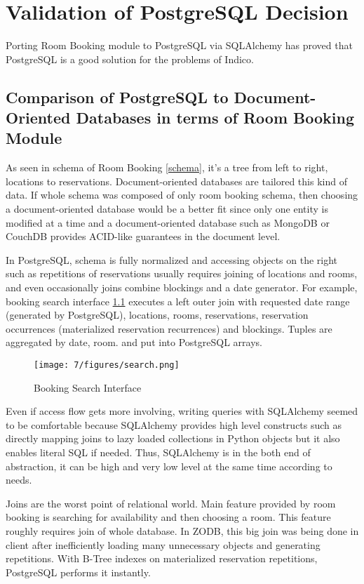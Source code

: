 \chapter{Validation of PostgreSQL Decision}

Porting Room Booking module to PostgreSQL via SQLAlchemy has proved that PostgreSQL is a good solution for the problems of Indico.

\section{Comparison of PostgreSQL to Document-Oriented Databases in terms of Room Booking Module}

As seen in schema of Room Booking \ref{schema}, it's a tree from left to right, locations to reservations. Document-oriented databases are tailored this kind of data. If whole schema was composed of only room booking schema, then choosing a document-oriented database would be a better fit since only one entity is modified at a time and a document-oriented database such as MongoDB or CouchDB provides ACID-like guarantees in the document level.

In PostgreSQL, schema is fully normalized and accessing objects on the right such as repetitions of reservations usually requires joining of locations and rooms, and even occasionally joins combine blockings and a date generator. For example, booking search interface \ref{search} executes a left outer join with requested date range (generated by PostgreSQL), locations, rooms, reservations, reservation occurrences (materialized reservation recurrences) and blockings. Tuples are aggregated by date, room. and put into PostgreSQL arrays.

\begin{figure}[!ht]
  \caption{Booking Search Interface}
  \centering
    \texttt{[image: 7/figures/search.png]}
  \label{search}
\end{figure}

Even if access flow gets more involving, writing queries with SQLAlchemy seemed to be comfortable because SQLAlchemy provides high level constructs such as directly mapping joins to lazy loaded collections in Python objects but it also enables literal SQL if needed. Thus, SQLAlchemy is in the both end of abstraction, it can be high and very low level at the same time according to needs.

Joins are the worst point of relational world. Main feature provided by room booking is searching for availability and then choosing a room. This feature roughly requires join of whole database. In ZODB, this big join was being done in client after inefficiently loading many unnecessary objects and generating repetitions. With B-Tree indexes on materialized reservation repetitions, PostgreSQL performs it instantly.


